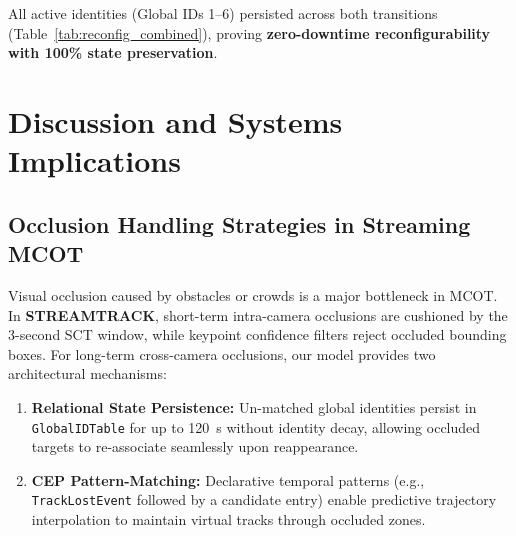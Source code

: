 \documentclass[conference]{IEEEtran}
\begin{document}
\begin{table}[t!]
\centering
\caption{Live Network Reconfiguration Timing and Global ID State Continuity}
\label{tab:reconfig_combined}
\end{table}

All active identities (Global IDs 1--6) persisted across both transitions (Table~\ref{tab:reconfig_combined}), proving \textbf{zero-downtime reconfigurability with 100\% state preservation}.

\section{Discussion and Systems Implications}
\label{sec:discussion}

\subsection{Occlusion Handling Strategies in Streaming MCOT}
Visual occlusion caused by obstacles or crowds is a major bottleneck in MCOT. In \textbf{STREAMTRACK}, short-term intra-camera occlusions are cushioned by the 3-second SCT window, while keypoint confidence filters reject occluded bounding boxes. For long-term cross-camera occlusions, our model provides two architectural mechanisms:
\begin{enumerate}
    \item \textbf{Relational State Persistence:} Un-matched global identities persist in \texttt{GlobalIDTable} for up to 120~s without identity decay, allowing occluded targets to re-associate seamlessly upon reappearance.
    \item \textbf{CEP Pattern-Matching:} Declarative temporal patterns (e.g., \texttt{TrackLostEvent} followed by a candidate entry) enable predictive trajectory interpolation to maintain virtual tracks through occluded zones.
\end{enumerate}
\end{document}
